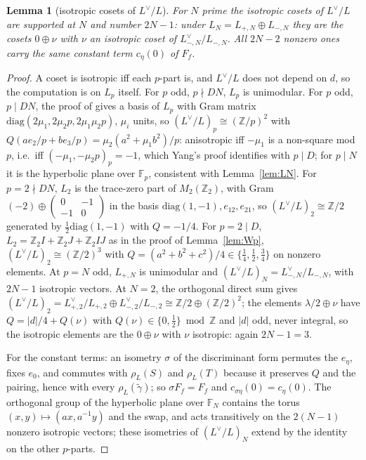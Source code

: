 \documentclass[11pt,reqno]{amsart}
\theoremstyle{plain}
\newtheorem{lemma}[theorem]{Lemma}
\theoremstyle{definition}
\newcommand{\Z}{\mathbb{Z}}
\newcommand{\Ldual}{L^{\vee}}
\begin{document}
\begin{lemma}[isotropic cosets of $\Ldual/L$]\label{lem:iso}
For $N$ prime the isotropic cosets of $\Ldual/L$ are supported at $N$ and number $2N-1$: under
$L_N=L_{+,N}\oplus L_{-,N}$ they are the cosets $0\oplus\nu$ with $\nu$ an isotropic coset of
$L_{-,N}^\vee/L_{-,N}$. All $2N-2$ nonzero ones carry the same constant term $c_\eta(0)$ of $F_f$.
\end{lemma}
\begin{proof}
A coset is isotropic iff each $p$-part is, and $\Ldual/L$ does not depend on $d$, so the
computation is on $L_p$ itself. For $p$ odd, $p\nmid DN$, $L_p$ is unimodular. For $p$ odd,
$p\mid DN$, the proof of \cite[Lemma~18]{Yang} gives a basis of $L_p$ with Gram matrix
$\mathrm{diag}(2\mu_1,2\mu_2p,2\mu_1\mu_2p)$, $\mu_i$ units, so $(\Ldual/L)_p\cong(\Z/p)^2$ with
$Q(ae_2/p+be_3/p)=\mu_2(a^2+\mu_1b^2)/p$: anisotropic iff $-\mu_1$ is a non-square mod $p$, i.e.\
iff $(-\mu_1,-\mu_2p)_p=-1$, which Yang's proof identifies with $p\mid D$; for $p\mid N$ it is the
hyperbolic plane over $\mathbb F_p$, consistent with Lemma~\ref{lem:LN}. For $p=2\nmid DN$, $L_2$
is the trace-zero part of $M_2(\Z_2)$, with Gram $(-2)\oplus\begin{pmatrix}0&-1\\-1&0\end{pmatrix}$
in the basis $\mathrm{diag}(1,-1),e_{12},e_{21}$, so $(\Ldual/L)_2\cong\Z/2$ generated by
$\tfrac12\mathrm{diag}(1,-1)$ with $Q=-1/4$. For $p=2\mid D$, $L_2=\Z_2I+\Z_2J+\Z_2IJ$ as in the
proof of Lemma~\ref{lem:Wp}, $(\Ldual/L)_2\cong(\Z/2)^3$ with $Q=(a^2+b^2+c^2)/4\in\{\tfrac14,
\tfrac12,\tfrac34\}$ on nonzero elements. At $p=N$ odd, $L_{+,N}$ is unimodular and
$(\Ldual/L)_N=L_{-,N}^\vee/L_{-,N}$, with $2N-1$ isotropic vectors. At $N=2$, the orthogonal direct
sum gives $(\Ldual/L)_2=L_{+,2}^\vee/L_{+,2}\oplus L_{-,2}^\vee/L_{-,2}\cong\Z/2\oplus(\Z/2)^2$; the
elements $\lambda/2\oplus\nu$ have $Q=\lvert d\rvert/4+Q(\nu)$ with $Q(\nu)\in\{0,\tfrac12\}\bmod
\Z$ and $\lvert d\rvert$ odd, never integral, so the isotropic elements are the $0\oplus\nu$ with
$\nu$ isotropic: again $2N-1=3$.

For the constant terms: an isometry $\sigma$ of the discriminant form permutes the $e_\eta$, fixes
$e_0$, and commutes with $\rho_L(S)$ and $\rho_L(T)$ because it preserves $Q$ and the pairing,
hence with every $\rho_L(\tilde\gamma)$; so $\sigma F_f=F_f$ and $c_{\sigma\eta}(0)=c_\eta(0)$. The
orthogonal group of the hyperbolic plane over $\mathbb F_N$ contains the torus $(x,y)\mapsto
(ax,a^{-1}y)$ and the swap, and acts transitively on the $2(N-1)$ nonzero isotropic vectors; these
isometries of $(\Ldual/L)_N$ extend by the identity on the other $p$-parts.
\end{proof}
\end{document}
